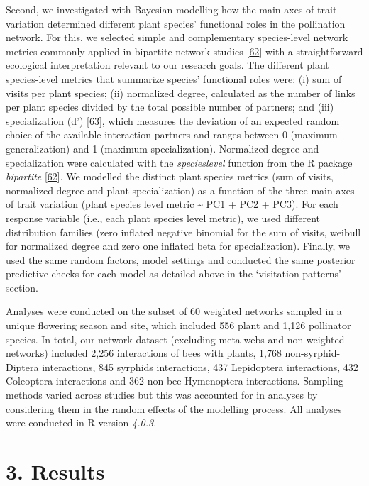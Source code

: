 \documentclass[
  12pt,
  a4paper,
]{article}
\begin{document}
Second, we investigated with Bayesian modelling how the main axes of trait variation determined different plant species' functional roles in the pollination network. For this, we selected simple and complementary species-level network metrics commonly applied in bipartite network studies {[}\protect\hyperlink{ref-dormann2008}{62}{]} with a straightforward ecological interpretation relevant to our research goals. The different plant species-level metrics that summarize species' functional roles were: (i) sum of visits per plant species; (ii) normalized degree, calculated as the number of links per plant species divided by the total possible number of partners; and (iii) specialization (d') {[}\protect\hyperlink{ref-bluthgen2006}{63}{]}, which measures the deviation of an expected random choice of the available interaction partners and ranges between 0 (maximum generalization) and 1 (maximum specialization). Normalized degree and specialization were calculated with the \emph{specieslevel} function from the R package \emph{bipartite} {[}\protect\hyperlink{ref-dormann2008}{62}{]}. We modelled the distinct plant species metrics (sum of visits, normalized degree and plant specialization) as a function of the three main axes of trait variation (plant species level metric \textasciitilde{} PC1 + PC2 + PC3). For each response variable (i.e., each plant species level metric), we used different distribution families (zero inflated negative binomial for the sum of visits, weibull for normalized degree and zero one inflated beta for specialization). Finally, we used the same random factors, model settings and conducted the same posterior predictive checks for each model as detailed above in the `visitation patterns' section.

Analyses were conducted on the subset of 60 weighted networks sampled in a unique flowering season and site, which included 556 plant and 1,126 pollinator species. In total, our network dataset (excluding meta-webs and non-weighted networks) included 2,256 interactions of bees with plants, 1,768 non-syrphid-Diptera interactions, 845 syrphids interactions, 437 Lepidoptera interactions, 432 Coleoptera interactions and 362 non-bee-Hymenoptera interactions. Sampling methods varied across studies but this was accounted for in analyses by considering them in the random effects of the modelling process. All analyses were conducted in R version \emph{4.0.3}.

\hypertarget{results}{%
\section{3. Results}\label{results}}
\end{document}
